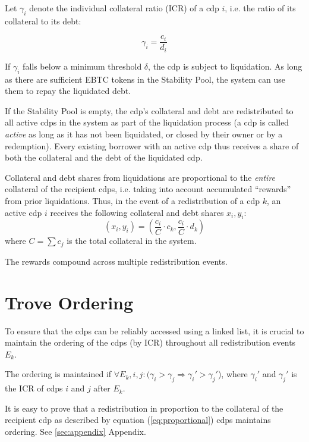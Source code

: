 \documentclass[reqno]{article}
\begin{document}
Let $\gamma_i$ denote the individual collateral ratio (ICR) of a cdp $i$, i.e. the ratio of its collateral to its debt:

\begin{equation}
    \gamma_i = \frac{c_i} {d_i}
\end{equation}

If $\gamma_i$ falls below a minimum threshold $\delta$, the cdp is subject to liquidation. As long as there are sufficient EBTC tokens in the Stability Pool, the system can use them to repay the liquidated debt. 

If the Stability Pool is empty, the cdp's collateral and debt are redistributed to all active cdps in the system as part of the liquidation process (a cdp is called \textit{active} as long as it has not been liquidated, or closed by their owner or by a redemption). Every existing borrower with an active cdp thus receives a share of both the collateral and the debt of the liquidated cdp.

Collateral and debt shares from liquidations are proportional to the \textit{entire} collateral of the recipient cdps, i.e. taking into account accumulated “rewards” from prior liquidations. Thus, in the event of a redistribution of a cdp $k$, an active cdp $i$ receives the following collateral and debt shares $x_i,y_i$:  
\begin{equation} \label{eq:proportional}
  (x_i, y_i) = \left(\frac{c_i}{C} \cdot c_k, \frac{c_i}{C} \cdot d_k\right)
\end{equation}
where $C=\sum c_j$ is the total collateral in the system.

The rewards compound across multiple redistribution events.

\section{Trove Ordering}
To ensure that the cdps can be reliably accessed using a linked list, it is crucial to maintain the ordering of the cdps (by ICR) throughout all redistribution events $E_k$.

The ordering is maintained if $\forall{E_k,i,j}: (\gamma_i > \gamma_j	\Longrightarrow \gamma_i' > \gamma_j'$), where $\gamma_i'$ and $\gamma_j'$ is the ICR of cdps $i$ and $j$ after $E_k$.

It is easy to prove that a redistribution in proportion to the collateral of the recipient cdp as described by equation (\ref{eq:proportional}) cdps maintains ordering. See \ref{sec:appendix} Appendix.
\end{document}

